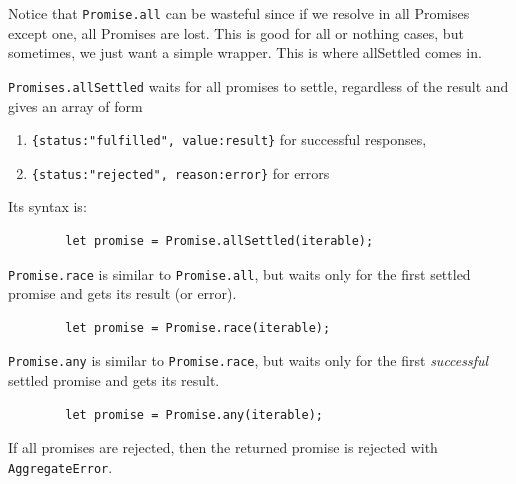 \documentclass{article}
\begin{document}
    Notice that \texttt{Promise.all} can be wasteful since if we resolve in all Promises except one, all Promises are lost. This is good for all or nothing cases, but sometimes, we just want a simple wrapper. This is where allSettled comes in. 

    \begin{definition}
      \texttt{Promises.allSettled} waits for all promises to settle, regardless of the result and gives an array of form 
      \begin{enumerate}
        \item \texttt{\{status:"fulfilled", value:result\}} for successful responses, 
        \item \texttt{\{status:"rejected", reason:error\}} for errors
      \end{enumerate}
      Its syntax is: 
      \begin{lstlisting}
        let promise = Promise.allSettled(iterable); 
      \end{lstlisting}
    \end{definition}

    \begin{definition}
      \texttt{Promise.race} is similar to \texttt{Promise.all}, but waits only for the first settled promise and gets its result (or error). 
      \begin{lstlisting}
        let promise = Promise.race(iterable); 
      \end{lstlisting}
    \end{definition}

    \begin{definition}
      \texttt{Promise.any} is similar to \texttt{Promise.race}, but waits only for the first \textit{successful} settled promise and gets its result. 
      \begin{lstlisting}
        let promise = Promise.any(iterable); 
      \end{lstlisting}
      If all promises are rejected, then the returned promise is rejected with \texttt{AggregateError}. 
    \end{definition}
\end{document}

